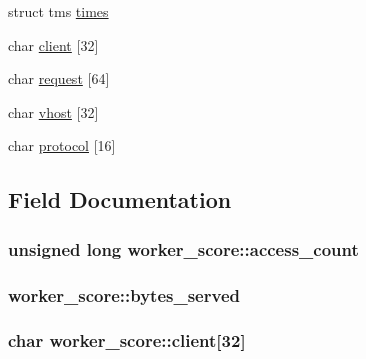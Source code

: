 \begin{DoxyCompactItemize}
\item 
struct tms \hyperlink{structworker__score_add8155c70a6183a4db2976a1e308aeae}{times}
\item 
char \hyperlink{structworker__score_a23647dc58ecddfc6a2a87592bca1d596}{client} \mbox{[}32\mbox{]}
\item 
char \hyperlink{structworker__score_a946cee1766f6e41b00da3daeb154cbb7}{request} \mbox{[}64\mbox{]}
\item 
char \hyperlink{structworker__score_a1c3f78874e38e7c13ac75aefb6a97e2c}{vhost} \mbox{[}32\mbox{]}
\item 
char \hyperlink{structworker__score_aa4ce75cc6a5ed19727e28e4614d4b0a5}{protocol} \mbox{[}16\mbox{]}
\end{DoxyCompactItemize}


\subsection{Field Documentation}
\subsubsection[{\texorpdfstring{access\+\_\+count}{access_count}}]{\setlength{\rightskip}{0pt plus 5cm}unsigned long worker\+\_\+score\+::access\+\_\+count}\hypertarget{structworker__score_a5ecd56707dd31f7dfa8b287db7dc0196}{}\label{structworker__score_a5ecd56707dd31f7dfa8b287db7dc0196}
\subsubsection[{\texorpdfstring{bytes\+\_\+served}{bytes_served}}]{ worker\+\_\+score\+::bytes\+\_\+served}\hypertarget{structworker__score_aaf705b3f798f1471daba811228464337}{}\label{structworker__score_aaf705b3f798f1471daba811228464337}
\subsubsection[{\texorpdfstring{client}{client}}]{\setlength{\rightskip}{0pt plus 5cm}char worker\+\_\+score\+::client\mbox{[}32\mbox{]}}\hypertarget{structworker__score_a23647dc58ecddfc6a2a87592bca1d596}{}\label{structworker__score_a23647dc58ecddfc6a2a87592bca1d596}
